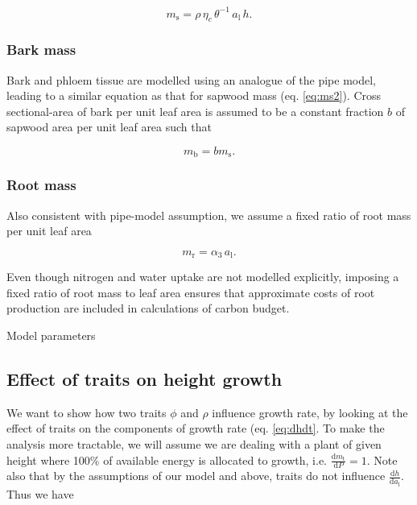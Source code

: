 \documentclass[12pt, a4paper]{article}
\begin{document}
\begin{equation}\label{eq:ms2}
m_\textrm{s}=\rho \, \eta_c \, \theta^{-1} \, a_\textrm{l} \, h.
\end{equation}

\subsubsection{Bark mass}\label{bark-mass}

Bark and phloem tissue are modelled using an analogue of the pipe model,
leading to a similar equation as that for sapwood mass (eq.
\ref{eq:ms2}). Cross sectional-area of bark per unit leaf area is
assumed to be a constant fraction \(b\) of sapwood area per unit leaf
area such that

\begin{equation}\label{eq:mb}
m_\textrm{b}=b m_\textrm{s}.
\end{equation}

\subsubsection{Root mass}\label{root-mass}

Also consistent with pipe-model assumption, we assume a fixed ratio of
root mass per unit leaf area

\begin{equation}\label{eq:mr}
m_\textrm{r}=\alpha_3 \, a_\textrm{l}.
\end{equation}

Even though nitrogen and water uptake are not modelled explicitly,
imposing a fixed ratio of root mass to leaf area ensures that
approximate costs of root production are included in calculations of
carbon budget.

\newpage

\begin{table}[h]
\caption{Model parameters}
\centering



\label{tab:params}
\end{table}


\subsection{Effect of traits on height growth} \label{trait-values-maximising-height-growth}

We want to show how two traits $\phi$ and $\rho$ influence growth rate,
by looking at the effect of
traits on the components of growth rate (eq. \ref{eq:dhdt}. To make
the analysis more tractable, we will assume we are dealing with a plant of
given height where 100\% of available energy is allocated to growth,
i.e. \(\frac{\textrm{d}m_\textrm{t}}{\textrm{d}P}=1\). Note also
that by the assumptions of our model and above, traits do not influence
\(\frac{\textrm{d}h} {\textrm{d}a_\textrm{l}}\). Thus we have
\end{document}
